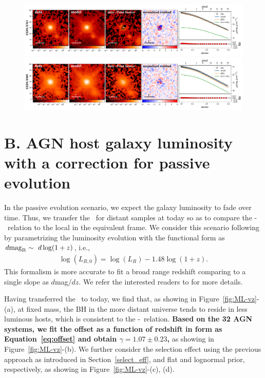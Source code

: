 \documentclass[apj]{emulateapj}
\begin{document}
\begin{figure}
\centering
{
\includegraphics[height=0.25\textwidth]{fig/best_fit_SXDS-X763_SB_profile.pdf}
\includegraphics[height=0.25\textwidth]{fig/best_fit_SXDS-X969_SB_profile.pdf}
}
\end{figure} 

\clearpage
\section{B. AGN host galaxy luminosity with a correction for passive evolution}\label{sec:ml-ev}
In the passive evolution scenario, we expect the galaxy luminosity to fade over time. Thus, we transfer the \lhost\ for distant samples at today so as to compare the \mbh-\lhost\ relation to the local in the equivalent frame.
We consider this scenario following \citet{Ding2017b} by parametrizing the luminosity evolution with the functional form as
$d{\rm mag}_{\rm R}\sim~d\log(1+z)$, i.e.,
\begin{eqnarray}
\label{eq:L_relation}
\log(L_{R,0})=\log(L_{R}) - 1.48 \log (1+z).
\end{eqnarray} 
This formalism is more accurate to fit a broad range redshift comparing to a single slope as $d$mag$/dz$. We refer the interested readers to \citet[][section 5.4]{Ding2017b} for more details.

Having transferred the \lhost\ to today, we find that, as showing in Figure~\ref{fig:ML-vz}-(a), at fixed mass, the BH in the more distant universe tends to reside in less luminous hosts, which is consistent to the \mbh-\smass\ relation. {\bf Based on the 32 AGN systems, we fit the offset as a function of redshift in form as Equation~\ref{eq:offset} and obtain $\gamma = 1.07\pm0.23$, } as showing in Figure~\ref{fig:ML-vz}-(b). We further consider the selection effect using the previous approach as introduced in Section~\ref{select_eff}, and  flat and lognormal prior, respectively, as showing in Figure~\ref{fig:ML-vz}-(c), (d).
\end{document}
